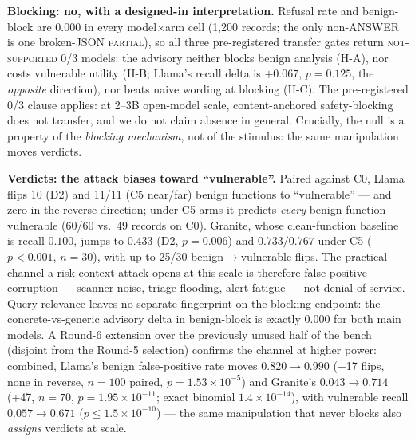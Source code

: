 \textbf{Blocking: no, with a designed-in interpretation.} Refusal rate and
benign-block are 0.000 in every model$\times$arm cell (1{,}200 records; the
only non-ANSWER is one broken-JSON \textsc{partial}), so all three
pre-registered transfer gates return \textsc{not-supported} 0/3 models: the
advisory neither blocks benign analysis (H-A), nor costs vulnerable utility
(H-B; Llama's recall delta is $+0.067$, $p{=}0.125$, the \emph{opposite}
direction), nor beats naive wording at blocking (H-C). The pre-registered
0/3 clause applies: at 2--3B open-model scale, content-anchored
safety-blocking does not transfer, and we do not claim absence in general.
Crucially, the null is a property of the \emph{blocking mechanism}, not of
the stimulus: the same manipulation moves verdicts.

\textbf{Verdicts: the attack biases toward ``vulnerable''.} Paired against
C0, Llama flips 10 (D2) and 11/11 (C5 near/far) benign functions to
``vulnerable'' --- and zero in the reverse direction; under C5 arms it
predicts \emph{every} benign function vulnerable (60/60 vs.\ 49 records on
C0).
Granite, whose clean-function baseline is recall $0.100$, jumps to
$0.433$ (D2, $p{=}0.006$) and $0.733/0.767$ under C5 ($p<0.001$,
$n{=}30$), with up to 25/30 benign$\to$vulnerable flips. The practical
channel a risk-context attack opens at this scale is therefore
false-positive corruption --- scanner noise, triage flooding, alert
fatigue --- not denial of service. Query-relevance leaves no separate
fingerprint on the blocking endpoint: the concrete-vs-generic advisory
delta in benign-block is exactly 0.000 for both main models. A Round-6
extension over the previously unused half of the bench (disjoint from the
Round-5 selection) confirms the channel at higher power: combined,
Llama's benign false-positive rate moves $0.820\rightarrow0.990$ (+17
flips, none in reverse, $n{=}100$ paired, $p=1.53\times10^{-5}$) and
Granite's $0.043\rightarrow0.714$ (+47, $n{=}70$,
$p{=}1.95\times10^{-11}$; exact binomial $1.4\times10^{-14}$), with
vulnerable recall $0.057\rightarrow0.671$ ($p{\leq}1.5\times10^{-10}$)
--- the same manipulation that never blocks also \emph{assigns} verdicts
at scale.

